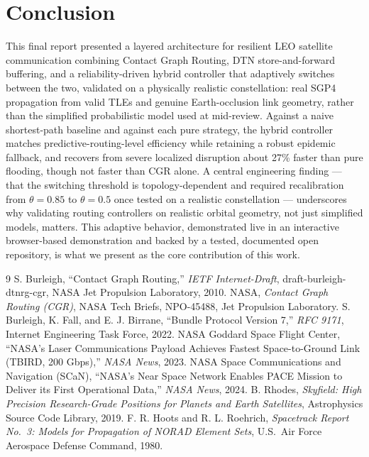 \documentclass[10pt,twocolumn]{article}
\begin{document}
\section{Conclusion}

This final report presented a layered architecture for resilient LEO satellite communication combining Contact Graph Routing, DTN store-and-forward buffering, and a reliability-driven hybrid controller that adaptively switches between the two, validated on a physically realistic constellation: real SGP4 propagation from valid TLEs and genuine Earth-occlusion link geometry, rather than the simplified probabilistic model used at mid-review. Against a naive shortest-path baseline and against each pure strategy, the hybrid controller matches predictive-routing-level efficiency while retaining a robust epidemic fallback, and recovers from severe localized disruption about 27\% faster than pure flooding, though not faster than CGR alone. A central engineering finding --- that the switching threshold is topology-dependent and required recalibration from $\theta=0.85$ to $\theta=0.5$ once tested on a realistic constellation --- underscores why validating routing controllers on realistic orbital geometry, not just simplified models, matters. This adaptive behavior, demonstrated live in an interactive browser-based demonstration and backed by a tested, documented open repository, is what we present as the core contribution of this work.

\begin{thebibliography}{9}
 S. Burleigh, ``Contact Graph Routing,'' \emph{IETF Internet-Draft}, draft-burleigh-dtnrg-cgr, NASA Jet Propulsion Laboratory, 2010.
 NASA, \emph{Contact Graph Routing (CGR)}, NASA Tech Briefs, NPO-45488, Jet Propulsion Laboratory.
 S. Burleigh, K. Fall, and E. J. Birrane, ``Bundle Protocol Version 7,'' \emph{RFC 9171}, Internet Engineering Task Force, 2022.
 NASA Goddard Space Flight Center, ``NASA's Laser Communications Payload Achieves Fastest Space-to-Ground Link (TBIRD, 200 Gbps),'' \emph{NASA News}, 2023.
 NASA Space Communications and Navigation (SCaN), ``NASA's Near Space Network Enables PACE Mission to Deliver its First Operational Data,'' \emph{NASA News}, 2024.
 B. Rhodes, \emph{Skyfield: High Precision Research-Grade Positions for Planets and Earth Satellites}, Astrophysics Source Code Library, 2019.
 F. R. Hoots and R. L. Roehrich, \emph{Spacetrack Report No.\ 3: Models for Propagation of NORAD Element Sets}, U.S.\ Air Force Aerospace Defense Command, 1980.
\end{thebibliography}
\end{document}
